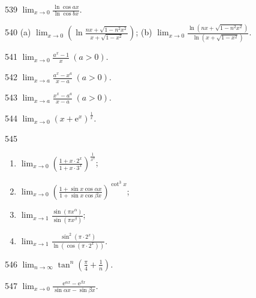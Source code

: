 \begin{prob}[S]{539}
$\displaystyle \lim_{x\to 0} \frac{\ln\cos ax}{\ln\cos bx}.$
\end{prob}

\begin{prob}[M]{540}
(a) $\displaystyle \lim_{x\to 0} \left(\ln\frac{nx+\sqrt{1-n^2 x^2}}{x+\sqrt{1-x^2}}\right)$; \qquad (b) $\displaystyle \lim_{x\to 0} \frac{\ln(nx+\sqrt{1-n^2 x^2})}{\ln(x+\sqrt{1-x^2})}.$
\end{prob}

\begin{prob}[S]{541}
$\displaystyle \lim_{x\to 0} \frac{a^x - 1}{x} \ (a > 0).$
\end{prob}

\begin{prob}[S]{542}
$\displaystyle \lim_{x\to a} \frac{a^x - x^a}{x-a} \ (a > 0).$
\end{prob}

\begin{prob}[S]{543}
$\displaystyle \lim_{x\to a} \frac{x^x - a^a}{x-a} \ (a > 0).$
\end{prob}

\begin{prob}[S]{544}
$\displaystyle \lim_{x\to 0} (x+\mathrm{e}^x)^{\frac{1}{x}}.$
\end{prob}

\begin{prob}[L]{545}
\begin{enumerate}[label=(\alph*), itemsep=2pt, topsep=3pt]
  \item $\displaystyle \lim_{x\to 0} \left(\frac{1+x\cdot 2^x}{1+x\cdot 3^x}\right)^{\frac{1}{x^2}}$;
  \item $\displaystyle \lim_{x\to 0} \left(\frac{1+\sin x\cos\alpha x}{1+\sin x\cos\beta x}\right)^{\cot^3 x}$;
  \item $\displaystyle \lim_{x\to 1} \frac{\sin(\pi x^\alpha)}{\sin(\pi x^\beta)}$;
  \item $\displaystyle \lim_{x\to 1} \frac{\sin^2(\pi\cdot 2^x)}{\ln(\cos(\pi\cdot 2^x))}.$
\end{enumerate}
\end{prob}

\begin{prob}[S]{546}
$\displaystyle \lim_{n\to \infty} \tan^n \left(\frac{\pi}{4}+\frac{1}{n}\right).$
\end{prob}

\begin{prob}[S]{547}
$\displaystyle \lim_{x\to 0} \frac{\mathrm{e}^{\alpha x} - \mathrm{e}^{\beta x}}{\sin\alpha x - \sin\beta x}.$
\end{prob}

